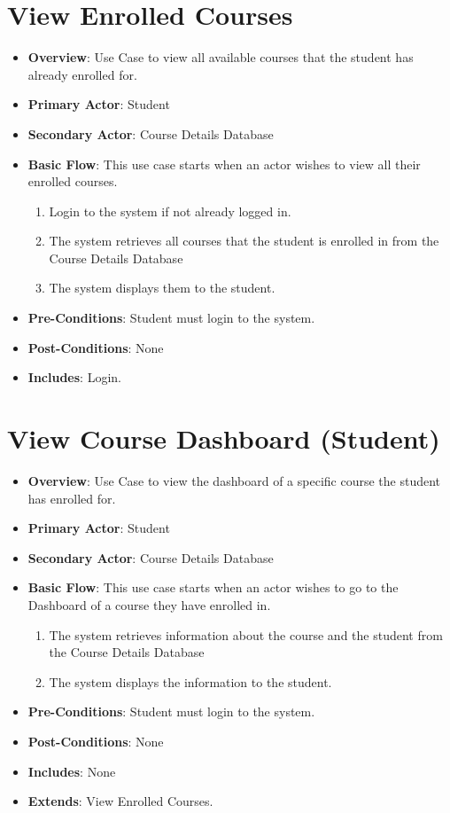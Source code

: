\documentclass[12pt, a4]{report}
\begin{document}
\section{View Enrolled Courses}
\begin{itemize}
    \item \textbf{Overview}: Use Case to view all available courses that the student has already enrolled for.
    \item \textbf{Primary Actor}: Student
    \item \textbf{Secondary Actor}: Course Details Database
    \item \textbf{Basic Flow}: This use case starts when an actor wishes to view all their enrolled courses.
        \begin{enumerate}
            \item Login to the system if not already logged in.
            \item The system retrieves all courses that the student is enrolled in from the Course Details Database
            \item The system displays them to the student.
        \end{enumerate}
    \item \textbf{Pre-Conditions}: Student must login to the system.
    \item \textbf{Post-Conditions}: None
    \item \textbf{Includes}: Login.
\end{itemize}


\section{View Course Dashboard (Student)}
\begin{itemize}
    \item \textbf{Overview}: Use Case to view the dashboard of a specific course the student has enrolled for.
    \item \textbf{Primary Actor}: Student
    \item \textbf{Secondary Actor}: Course Details Database
    \item \textbf{Basic Flow}: This use case starts when an actor wishes to go to the Dashboard of a course they have enrolled in.
        \begin{enumerate}
            \item The system retrieves information about the course and the student from the Course Details Database
            \item The system displays the information to the student.
        \end{enumerate}
    \item \textbf{Pre-Conditions}: Student must login to the system.
    \item \textbf{Post-Conditions}: None
    \item \textbf{Includes}: None
    \item \textbf{Extends}: View Enrolled Courses.
\end{itemize}
\end{document}
